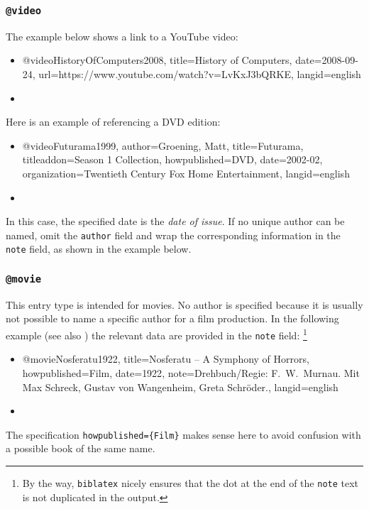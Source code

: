 \subsubsection{\texttt{\bfseries @video}}
\label{sec:@video}

The example below shows a link to a YouTube video:
%
\begin{itemize}
\item[]
\begin{GenericCode}[numbers=none]
@video{HistoryOfComputers2008,
  title={History of Computers},
  date={2008-09-24},
  url={https://www.youtube.com/watch?v=LvKxJ3bQRKE},
  langid={english}
}
\end{GenericCode}
\item[\cite{HistoryOfComputers2008}] 
\end{itemize}

\noindent
Here is an example of referencing a DVD edition:
%
\begin{itemize}
\item[]
\begin{GenericCode}[numbers=none]
@video{Futurama1999,
  author={Groening, Matt},
  title={Futurama},
  titleaddon={Season 1 Collection},
  howpublished={DVD},
  date={2002-02},
  organization={Twentieth Century Fox Home Entertainment},
  langid={english}
}
\end{GenericCode}
\item[\cite{Futurama1999}] 
\end{itemize}
%
In this case, the specified date is the \emph{date of issue}. If no unique
author can be named, omit the \texttt{author} field and wrap the corresponding
information in the \texttt{note} field, as shown in the example below.

\subsubsection{\texttt{\bfseries @movie}}
\label{sec:@movie}

This entry type is intended for movies. No author is specified because it is
usually not possible to name a specific author for a film production. In the
following example (see also \cite{Psycho1960}) the relevant data are provided
in the \texttt{note} field:%
\footnote{By the way, \texttt{biblatex} nicely ensures that the dot at the end
of the \texttt{note} text is not duplicated in the output.}
%
\begin{itemize}
\item[]
\begin{GenericCode}[numbers=none]
@movie{Nosferatu1922,
  title={Nosferatu -- A Symphony of Horrors},
  howpublished={Film},
  date={1922},
  note={Drehbuch/Regie: F.\ W.\ Murnau. Mit Max Schreck, Gustav von Wangenheim, Greta Schröder.},
  langid={english}
}
\end{GenericCode}
\item[\cite{Nosferatu1922}] 
\end{itemize}
%
The specification \verb!howpublished={Film}! makes sense here to avoid confusion
with a possible book of the same name.

